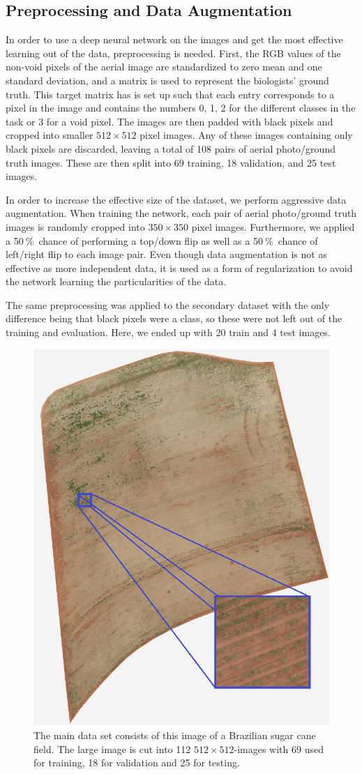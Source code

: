 \documentclass{article}
\newcommand{\pro}{\ensuremath{\ \%}}
\begin{document}
\subsection{Preprocessing and Data Augmentation}
In order to use a deep neural network on the images and get the most effective learning out of the data, preprocessing is needed.
First, the RGB values of the non-void pixels of the aerial image are standardized to zero mean and one standard deviation, and a matrix is used to represent the biologists' ground truth.
This target matrix has is set up such that each entry corresponds to a pixel in the image and contains the numbers 0, 1, 2 for the different classes in the task or 3 for a void pixel.
The images are then padded with black pixels and cropped into smaller $ 512\times 512 $ pixel images.
Any of these images containing only black pixels are discarded, leaving a total of 108 pairs of aerial photo/ground truth images.
These are then split into 69 training, 18 validation, and 25 test images.

In order to increase the effective size of the dataset, we perform aggressive data augmentation.
When training the network, each pair of aerial photo/ground truth images is randomly cropped into $ 350\times 350 $ pixel images.
Furthermore, we applied a 50\pro\ chance of performing a top/down flip as well as a 50\pro\ chance of left/right flip to each image pair.
Even though data augmentation is not as effective as more independent data, it is used as a form of regularization to avoid the network learning the particularities of the data.

The same preprocessing was applied to the secondary dataset with the only difference being that black pixels were a class, so these were not left out of the training and evaluation.
Here, we ended up with 20 train and 4 test images.
\begin{figure}[!h]
	\centering
	\includegraphics[width=0.5\linewidth]{../../poster/raw-min3}
	\caption{The main data set consists of this image of a Brazilian sugar cane field. The large image is cut into 112 \(512\times512\)-images with 69 used for training, 18 for validation and 25 for testing. }
	\label{fig:raw-min2}
\end{figure}
\end{document}
